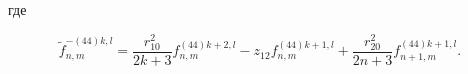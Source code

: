 \begin{theorem}
\noindent где

\begin{equation}\label{eq:1:101}
\tilde f_{n,m}^{ - (44)k,l} = \frac{{r_{10}^2}}{{2k + 3}}f_{n,m}^{(44)k + 2,l} - {z_{12}}f_{n,m}^{(44)k + 1,l} + \frac{{r_{20}^2}}{{2n + 3}}f_{n + 1,m}^{(44)k + 1,l}.
\end{equation}
\end{theorem}
%
